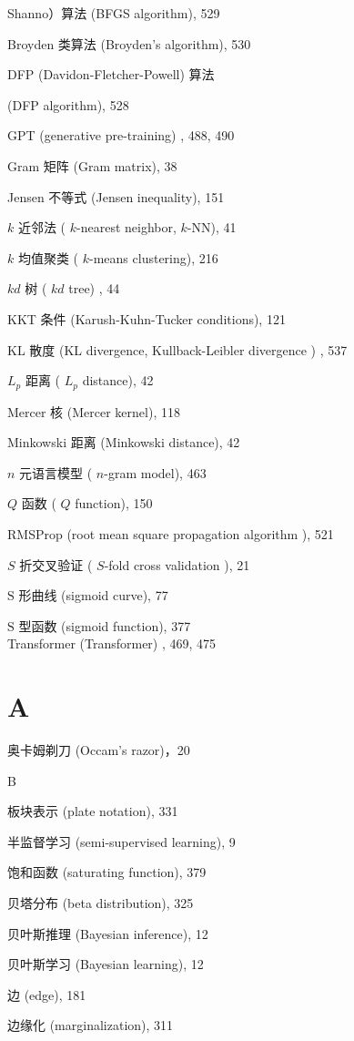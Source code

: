 \documentclass[10pt]{article}
\begin{document}
Shanno）算法 (BFGS algorithm), 529

Broyden 类算法 (Broyden's algorithm), 530

DFP (Davidon-Fletcher-Powell) 算法

(DFP algorithm), 528

GPT (generative pre-training) , 488, 490

Gram 矩阵 (Gram matrix), 38

Jensen 不等式 (Jensen inequality), 151

$k$ 近邻法 ( $k$-nearest neighbor, $k$-NN), 41

$k$ 均值聚类 ( $k$-means clustering), 216

$k d$ 树 ( $k d$ tree) , 44

KKT 条件 (Karush-Kuhn-Tucker conditions), 121

KL 散度 (KL divergence, Kullback-Leibler divergence ) , 537

$L_{p}$ 距离 ( $L_{p}$ distance), 42

Mercer 核 (Mercer kernel), 118

Minkowski 距离 (Minkowski distance), 42

$n$ 元语言模型 ( $n$-gram model), 463

$Q$ 函数 ( $Q$ function), 150

RMSProp (root mean square propagation algorithm ), 521

$S$ 折交叉验证 ( $S$-fold cross validation ), 21

$\mathrm{S}$ 形曲线 (sigmoid curve), 77

$\mathrm{S}$ 型函数 (sigmoid function), 377\\
Transformer (Transformer) , 469, 475

\section*{A}
奥卡姆剃刀 (Occam's razor)，20

B

板块表示 (plate notation), 331

半监督学习 (semi-supervised learning), 9

饱和函数 (saturating function), 379

贝塔分布 (beta distribution), 325

贝叶斯推理 (Bayesian inference), 12

贝叶斯学习 (Bayesian learning), 12

边 (edge), 181

边缘化 (marginalization), 311
\end{document}
